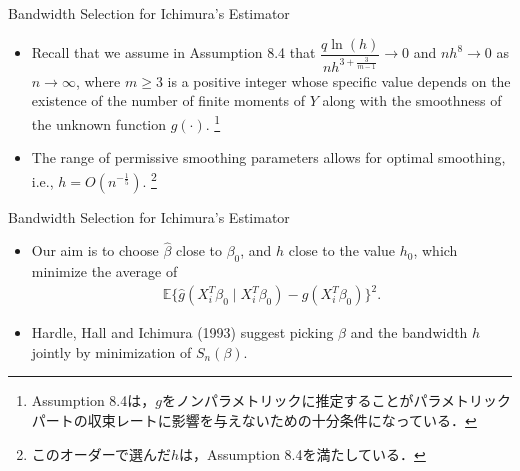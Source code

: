 \documentclass[xcolor=svgnames,dvipdfmx,cjk]{beamer}
\theoremstyle{example}
\def\E{\mathbb{E}}
\begin{document}
\begin{frame}{Bandwidth Selection for Ichimura's Estimator}
  \begin{itemize}
    \item Recall that we assume in Assumption 8.4 that 
          $\dfrac{q \ln(h)}{nh^{3 + \frac{3}{m-1}}} \to 0$ and 
          $ nh^8 \to 0$ as $n \to \infty$, 
          where $m \geq 3$ is a positive integer 
          whose specific value depends on the existence of the number of finite moments of $Y$ 
          along with the smoothness of the unknown function $g(\cdot)$.
          \footnote{Assumption 8.4は，$g$をノンパラメトリックに推定することがパラメトリックパートの収束レートに影響を与えないための十分条件になっている．}
    \item The range of permissive smoothing parameters allows for optimal smoothing, i.e., 
          $h=O(n^{-\frac{1}{5}})$.
          \footnote{このオーダーで選んだ$h$は，Assumption 8.4を満たしている．}
  \end{itemize}
\end{frame}

\begin{frame}{Bandwidth Selection for Ichimura's Estimator}
  \begin{itemize}
    \item Our aim is to choose $\hat{\beta}$ close to $\beta_0$, 
          and $h$ close to the value $h_0$, 
          which minimize the average of 
          \begin{align*}
            \E\{ \hat{g}(X_i^{T}\beta_0 \mid X_i^{T}\beta_0) - g(X_i^{T}\beta_0) \}^2.
          \end{align*}
    \item Hardle, Hall and Ichimura (1993) suggest 
          picking $\beta$ and the bandwidth $h$ jointly
          by minimization of $S_n(\beta)$.
  \end{itemize}    
\end{frame}
  
\end{document}
